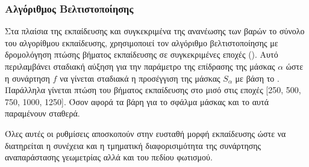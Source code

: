 \subsubsection{Αλγόριθμος Βελτιστοποίησης}
    Στα πλαίσια της εκπαίδευσης και συγκεκριμένα της ανανέωσης των βαρών το σύνολο του αλγορίθμου εκπαίδευσης, χρησιμοποιεί τον αλγόριθμο βελτιστοποίησης  με δρομολόγηση πτώσης βήματος εκπαίδευσης σε συγκεκριμένες εποχές (). Αυτό περιλαμβάνει σταδιακή αύξηση για την παράμετρο της επίδρασης της μάσκας $\alpha$ ώστε η συνάρτηση $f$ να γίνεται σταδιακά η προσέγγιση της μάσκας \(S_\alpha\) με βάση το . Παράλληλα γίνεται πτώση του βήματος εκπαίδευσης στο μισό στις εποχές [250, 500, 750, 1000, 1250].  Όσον αφορά τα βάρη για το σφάλμα μάσκας και το  αυτά παραμένουν σταθερά.
\par
    Όλες αυτές οι ρυθμίσεις αποσκοπούν στην ευσταθή μορφή εκπαίδευσης ώστε να διατηρείται η συνέχεια και η τμηματική διαφορισιμότητα της συνάρτησης αναπαράστασης γεωμετρίας αλλά και του πεδίου φωτισμού.


